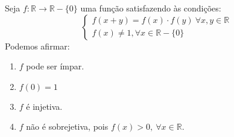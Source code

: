 \item
		Seja $f :\mathbb{R}\to \mathbb{R}-\{0\}$  uma função satisfazendo às condições:
		\[
		\begin{cases}
						f(x+y) =f(x)\cdot f(y)\ \forall x,y\in\mathbb{R}\\
						f(x)\neq 1, \forall x\in\mathbb{R}-\{0\}
		\end{cases}
		\]
Podemos afirmar:
		\begin{enumerate}
				\item $f$ pode ser ímpar. %
				\item $f(0)=1$
				\item $f$ é injetiva.
				\item  $f$ não é sobrejetiva, pois $f(x)>0,\ \forall x\in \mathbb{R}$.
		\end{enumerate}
